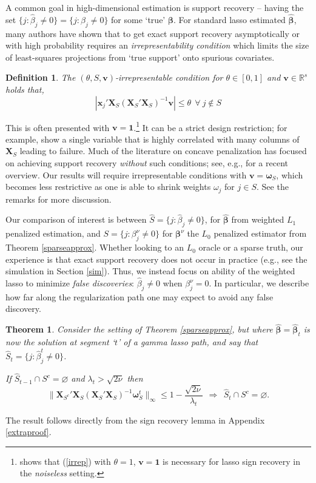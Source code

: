 \documentclass[12pt]{article}
\newtheorem{theorem}{\sc Theorem}[section]
\newtheorem{definition}{\sc Definition}[section]
\newcommand{\bs}[1]{\boldsymbol{#1}}
\newcommand{\bm}[1]{\mathbf{#1}}
\newcommand{\ds}[1]{\mathds{#1}}
\begin{document}
A common goal in high-dimensional estimation is  support recovery -- having the set $\{j: \hat\beta_j \neq 0\} = \{j: \beta_j \neq 0\}$ for some `true' $\bs{\beta}$.
For standard lasso estimated $\bs{\hat\beta}$, many authors have shown \citep[e.g.,][]{buhlmann_statistics_2011,zou_adaptive_2006} that to get exact support recovery asymptotically or with high probability requires an {\it irrepresentability condition} which limits the size of least-squares projections from `true support' onto spurious covariates.  
\begin{definition} 
The $(\theta,S,\bm{v})$-irrepresentable condition for $\theta\in[0,1]$ and $\bm{v}\in \ds{R}^s$ holds that, 
\begin{equation}\label{irrep}
|\bs{x}_j'\bm{X}_S(\bm{X}_S'\bm{X}_S)^{-1}\bm{v}| \leq \theta ~~\forall~j\notin S
\end{equation}
\end{definition}
\noindent This is often presented with $\bm{v}=\bm{1}$.\footnote{\cite{wainwright_sharp_2009} shows that (\ref{irrep}) with $\theta=1$, $\bm{v}=\bm{1}$ is necessary for lasso sign recovery in the {\it noiseless} setting.} It
can be a strict design restriction; for example,
\citet{buhlmann_statistics_2011} show a single variable that is
highly correlated with many columns of $\bm{X}_S$ leading to failure. Much
of the literature on concave penalization has focused on achieving
support recovery {\it without} such conditions; see, e.g.,
\cite{fan_strong_2014} for a recent overview.  
Our results will require irrepresentable conditions with $\bm{v} =
\bs{\omega}_S$, which becomes less restrictive as one is able to shrink
weights $\omega_j$ for $j\in S$.  See the remarks for more discussion.

Our comparison of interest is between $\hat S = \{j:
\hat\beta_j \neq 0\}$, for $\bs{\hat\beta}$ from weighted $L_1$ penalized
estimation, and $S = \{j:
\beta^\nu_j \neq 0\}$ for $\bs{\beta}^\nu$ the $L_0$ penalized estimator from
Theorem \ref{sparseapprox}. Whether looking to an $L_0$ oracle or a sparse
truth, our experience is that exact support recovery does not occur in
practice   (e.g., see the simulation in Section \ref{sim}).  Thus, we instead 
focus on ability of the weighted lasso to minimize {\it false discoveries}:
$\hat\beta_j
\neq 0$ when $\beta^\nu_j=0$.  In particular, we describe how far along the regularization path one may expect to avoid any false discovery.


\begin{theorem}
Consider the setting of Theorem \ref{sparseapprox}, but where $\bs{\hat\beta}
= \bs{\hat \beta}_t$ is now the solution at segment `$t$' of a gamma lasso path,
and say that $\hat S_{t} = \{j:\hat\beta^{t}_j\neq 0\}$.  

If $\hat S_{t-1}
\cap S^c = \varnothing$ and $\lambda_t > \sqrt{2\nu}$ then
\begin{equation}\label{falsepos}
\|\bm{X}_{S^c}'\bm{X}_S(\bm{X}_S'\bm{X}_S)^{-1}\bs{\omega}^t_S\|_{\infty} \leq 1 - \frac{\sqrt{2\nu}}{\lambda_t} ~~\Rightarrow~~\hat S_{t} \cap S^c = \varnothing.
\end{equation}
\end{theorem}
\noindent The result follows directly from the sign recovery lemma in Appendix
\ref{extraproof}. 
\end{document}
